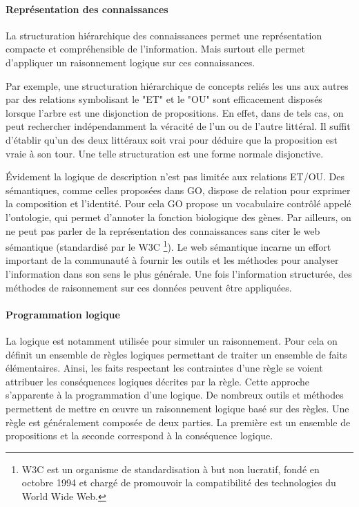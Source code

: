 \begin{refsegment}
    \paragraph{Représentation des connaissances}
    La structuration hiérarchique des connaissances permet une représentation compacte et compréhensible de l'information. Mais surtout elle permet d'appliquer un raisonnement logique sur ces connaissances.
    
    Par exemple, une structuration hiérarchique de concepts reliés les uns aux autres par des relations symbolisant le "ET" et le "OU" sont efficacement disposés lorsque l'arbre est une disjonction de propositions. En effet, dans de tels cas, on peut rechercher indépendamment la véracité de l'un ou de l'autre littéral. Il suffit d'établir qu'un des deux littéraux soit vrai pour déduire que la proposition est vraie à son tour. Une telle structuration est une forme normale disjonctive.   
    
    
    Évidement la logique de description n'est pas limitée aux relations ET/OU. Des sémantiques, comme celles proposées dans \acrfull{GO}, dispose de relation pour exprimer la composition et l'identité. Pour cela  \acrfull{GO} propose un vocabulaire contrôlé appelé l'ontologie, qui permet d'annoter la fonction biologique des gènes. Par ailleurs, on ne peut pas parler de la représentation des connaissances sans citer le web sémantique (standardisé par le W3C \footnote{W3C est un organisme de standardisation à but non lucratif, fondé en octobre 1994 et chargé de promouvoir la compatibilité des technologies du World Wide Web.}). Le web sémantique incarne un effort important de la communauté à fournir les outils et les méthodes pour analyser l'information dans son sens le plus générale. Une fois l'information structurée, des méthodes de raisonnement sur ces données peuvent être appliquées.
    
    \paragraph{Programmation logique}
    La logique est notamment utilisée pour simuler un raisonnement. Pour cela on définit un ensemble de règles logiques permettant de traiter un ensemble de faits élémentaires. Ainsi, les faits respectant les contraintes d'une règle se voient attribuer les conséquences logiques décrites par la règle. Cette approche s'apparente à la programmation d'une logique. De nombreux outils et méthodes permettent de mettre en œuvre un raisonnement logique basé sur des règles. Une règle est généralement composée de deux parties. La première est un ensemble de propositions et la seconde correspond à la conséquence logique.
    

\end{refsegment}

